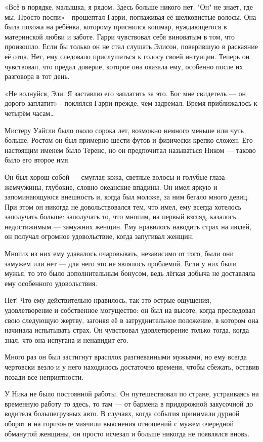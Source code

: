 \documentclass[a4paper,12pt]{book}
\begin{document}
«Всё в порядке, малышка, я рядом. Здесь больше никого нет. "Он" не знает, где мы. Просто поспи» - прошептал Гарри, поглаживая её шелковистые волосы. Она была похожа на ребёнка, которому приснился кошмар, нуждающегося в материнской любви и заботе. Гарри чувствовал себя виноватым в том, что произошло. Если бы только он не стал слушать Элисон, поверившую в раскаяние её отца. Нет, ему следовало прислушаться к голосу своей интуиции. Теперь он чувствовал, что предал доверие, которое она оказала ему, особенно после их разговора в тот день.
\par
«Не волнуйся, Эли. Я заставлю его заплатить за это. Бог мне свидетель — он дорого заплатит» - поклялся Гарри прежде, чем задремал. Время приближалось к четырём часам…\\
\par
Мистеру Уайтли было около сорока лет, возможно немного меньше или чуть больше. Ростом он был примерно шести футов и физически крепко сложен. Его настоящим именем было Теренс, но он предпочитал называться Ником — таково было его второе имя.
\par
Он был хорош собой — смуглая кожа, светлые волосы и голубые глаза-жемчужины, глубокие, словно океанские впадины. Он имел яркую и запоминающуюся внешность и, когда был моложе, за ним бегало много девиц. При этом он никогда не довольствовался тем, что имел, ему всегда хотелось заполучать больше: заполучать  то, что многим, на первый взгляд, казалось недостижимым — замужних женщин. Ему нравилось наводить страх на людей, он получал огромное удовольствие, когда запугивал женщин.
\par
Многих из них ему удавалось очаровывать, независимо от того, были они замужем или нет — для него это не являлось проблемой. Если у них были мужья, то это было дополнительным бонусом, ведь лёгкая добыча не доставляла ему особенного удовольствия.
\par
Нет! Что ему действительно нравилось, так это острые ощущения, удовлетворение и собственное могущество: он был на высоте, когда преследовал свою следующую жертву, загоняя её в затруднительное положение, в котором она начинала испытывать страх. Он чувствовал удовлетворение только тогда, когда знал, что она испугана и ненавидит его.
\par
Много раз он был застигнут врасплох разгневанными мужьями, но ему всегда чертовски везло и у него находилось достаточно времени, чтобы сбежать, оставив позади все неприятности.
\par
У Ника не было постоянной работы. Он путешествовал по стране, устраиваясь на временную работу то здесь, то там — от бармена в придорожной закусочной до водителя большегрузных авто. В случаях, когда события принимали дурной оборот и на горизонте маячили выяснения отношений с мужем очередной обманутой женщины, он просто исчезал и больше никогда не появлялся вновь.
\end{document}
